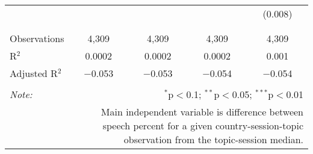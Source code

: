 \begin{table}[!htbp]
\begin{tabular}{@{\extracolsep{5pt}}lcccc}
  &  &  &  & (0.008) \\ 
  & & & & \\ 
\hline \\[-1.8ex] 
Observations & 4,309 & 4,309 & 4,309 & 4,309 \\ 
R$^{2}$ & 0.0002 & 0.0002 & 0.0002 & 0.001 \\ 
Adjusted R$^{2}$ & $-$0.053 & $-$0.053 & $-$0.054 & $-$0.054 \\ 
\hline 
\hline \\[-1.8ex] 
\textit{Note:}  & \multicolumn{4}{r}{$^{*}$p$<$0.1; $^{**}$p$<$0.05; $^{***}$p$<$0.01} \\ 
 & \multicolumn{4}{r}{Main independent variable is difference between speech percent for a given country-session-topic observation from the topic-session median.} \\ 
\end{tabular} 
\end{table} 
